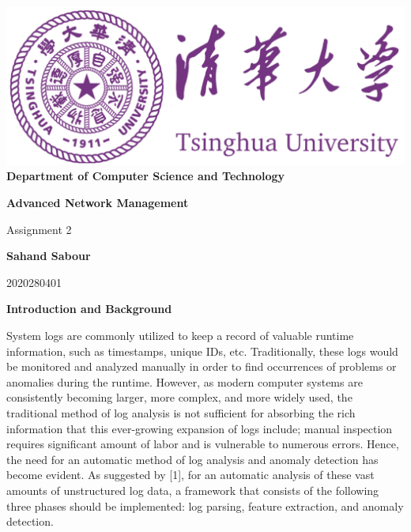 \documentclass[12pt,a4paper]{article}
\begin{document}
	\begin{titlepage}
		\begin{center}
			\includegraphics[scale=.4]{Figures/Cover}\\
			\vspace{1cm}
			\bf{ \large {Department of Computer Science and Technology} }
		\end{center}
		
		\vspace{4cm}
		\centering
		\textbf{\Huge Advanced Network Management}
		\vspace{.5cm}
		
		{\Large Assignment 2}

		\vspace{4cm}
		
		\textbf{\LARGE Sahand Sabour}
		
		\vspace{0.5cm}
		
		{\large 2020280401}
		
		
		\vfill
		
	\end{titlepage}

	\noindent \textbf{\Large Introduction and Background}
	\vspace{0.5cm}
	
	\noindent System logs are commonly utilized to keep a record of valuable runtime information, such as timestamps, unique IDs, etc. Traditionally, these logs would be monitored and analyzed manually in order to find occurrences of problems or anomalies during the runtime. However, as modern computer systems are consistently becoming larger, more complex, and more widely used, the traditional method of log analysis is not sufficient for absorbing the rich information that this ever-growing expansion of logs include; manual inspection requires significant amount of labor and is vulnerable to numerous errors. Hence, the need for an automatic method of log analysis and anomaly detection has become evident. As suggested by [1], for an automatic analysis of these vast amounts of unstructured log data, a framework that consists of the following three phases should be implemented: log parsing, feature extraction, and anomaly detection.
	
\end{document}
